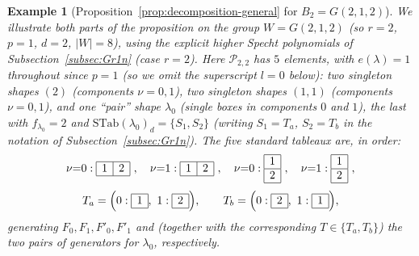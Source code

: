 \documentclass[11pt,a4paper]{article}
\newtheorem{example}[theorem]{Example}
\begin{document}
\begin{example}[Proposition~\ref{prop:decomposition-general} for $B_2 = G(2,1,2)$]\label{ex:prop29}
We illustrate both parts of the proposition on the group
$W = G(2,1,2)$ (so $r=2$, $p=1$, $d=2$, $|W|=8$), using the explicit
higher Specht polynomials of Subsection~\ref{subsec:Gr1n} (case $r=2$).
Here $\mathcal{P}_{2,2}$ has $5$ elements, with $e(\lambda)=1$
throughout since $p=1$ (so we omit the superscript $l=0$ below): two
singleton shapes $(2)$ (components $\nu=0,1$), two singleton shapes
$(1,1)$ (components $\nu=0,1$), and one ``pair'' shape $\lambda_0$
(single boxes in components $0$ and $1$), the last with
$f_{\lambda_0} = 2$ and $\mathrm{STab}(\lambda_0)_d = \{S_1,S_2\}$
(writing $S_1=T_a$, $S_2=T_b$ in the notation of
Subsection~\ref{subsec:Gr1n}). The five standard tableaux are, in
order:
\[
  \nu{=}0:\begin{array}{|c|c|}\hline 1&2\\\hline\end{array}\ ,\quad
  \nu{=}1:\begin{array}{|c|c|}\hline 1&2\\\hline\end{array}\ ,\quad
  \nu{=}0:\begin{array}{|c|}\hline 1\\\hline 2\\\hline\end{array}\ ,\quad
  \nu{=}1:\begin{array}{|c|}\hline 1\\\hline 2\\\hline\end{array}\ ,
\]
\[
  T_a = \Big(0:\begin{array}{|c|}\hline 1\\\hline\end{array},\
    1:\begin{array}{|c|}\hline 2\\\hline\end{array}\Big),
  \qquad
  T_b = \Big(0:\begin{array}{|c|}\hline 2\\\hline\end{array},\
    1:\begin{array}{|c|}\hline 1\\\hline\end{array}\Big),
\]
generating $F_0,F_1,F'_0,F'_1$ and (together with the corresponding
$T\in\{T_a,T_b\}$) the two pairs of generators for $\lambda_0$,
respectively.


\end{example}
\end{document}
